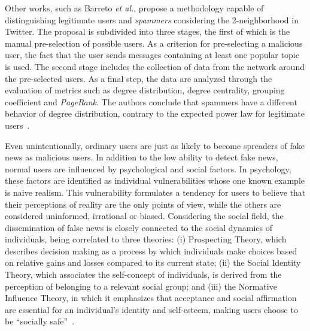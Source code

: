 \documentclass{ieeeaccess}
\begin{document}
Other works, such as Barreto {\it et al.}, propose a methodology capable of distinguishing legitimate users and \textit{spammers} considering the 2-neighborhood in Twitter. The proposal is subdivided into three stages, the first of which is the manual pre-selection of possible users. As a criterion for pre-selecting a malicious user, the fact that the user sends messages containing at least one popular topic is used. The second stage includes the collection of data from the network around the pre-selected users. As a final step, the data are analyzed through the evaluation of metrics such as degree distribution, degree centrality, grouping coefficient and \textit{PageRank}. The authors conclude that spammers have a different behavior of degree distribution, contrary to the expected power law for legitimate users~\cite{spam-ieee-access}.



Even unintentionally, ordinary users are just as likely to become spreaders of fake news as malicious users. In addition to the low ability to detect fake news, normal users are influenced by psychological and social factors. In psychology, these factors are identified as individual vulnerabilities whose one known example is naive realism. This vulnerability formulates a tendency for users to believe that their perceptions of reality are the only points of view, while the others are considered uninformed, irrational or biased. Considering the social field, the dissemination of false news is closely connected to the social dynamics of individuals, being correlated to three theories: (i) Prospecting Theory, which describes decision making as a process by which individuals make choices based on relative gains and losses compared to its current state; (ii) the Social Identity Theory, which associates the self-concept of individuals, is derived from the perception of belonging to a relevant social group; and (iii) the Normative Influence Theory, in which it emphasizes that acceptance and social affirmation are essential for an individual's identity and self-esteem, making users choose to be ``socially safe''~\cite{shu2017fake}.
\end{document}
